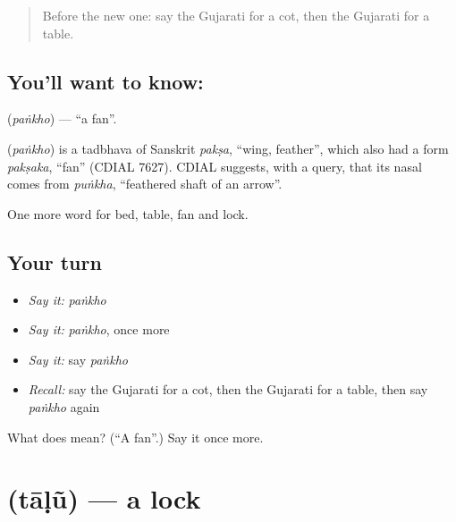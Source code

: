 \label{lesson:GU-C62-fan}



\begin{quote}
Before the new one: say the Gujarati for a cot, then the Gujarati for a table.
\end{quote}

\subsection*{You'll want to know: }
\textbf{} (\emph{paṅkho}) — \textquotedblleft{}a fan\textquotedblright{}.

\begin{cousinweb}
\textbf{} (\emph{paṅkho}) is a tadbhava of Sanskrit \emph{pakṣa}, \textquotedblleft{}wing, feather\textquotedblright{}, which also had a form \emph{pakṣaka}, \textquotedblleft{}fan\textquotedblright{} (CDIAL 7627). CDIAL suggests, with a query, that its nasal comes from \emph{puṅkha}, \textquotedblleft{}feathered shaft of an arrow\textquotedblright{}.
\end{cousinweb}

\begin{grammarlens}[title={What you've built}]
One more word for bed, table, fan and lock.
\end{grammarlens}

\subsection*{Your turn}
\begin{itemize}
\raggedright
  \item \emph{Say it:} \emph{paṅkho}
  \item \emph{Say it:} \emph{paṅkho}, once more
  \item \emph{Say it:} say \emph{paṅkho}
  \item \emph{Recall:} say the Gujarati for a cot, then the Gujarati for a table, then say \emph{paṅkho} again
\end{itemize}

\begin{tcolorbox}[breakable,colback=teal!4,colframe=teal!35!black,title={Before you move on}]
What does  mean? (\textquotedblleft{}A fan\textquotedblright{}.) Say it once more.
\end{tcolorbox}
\section[\texorpdfstring{\gu{તાળું} (tāḷũ)}{તાળું (tāḷũ)}]{ (tāḷũ) — a lock}

